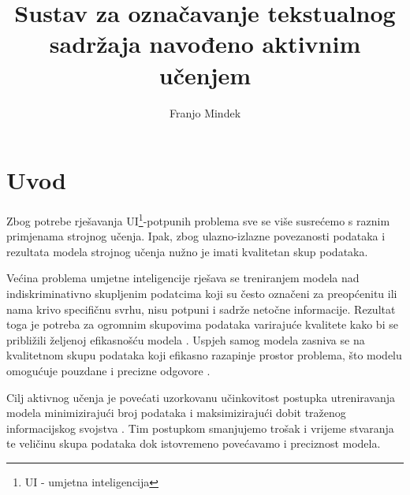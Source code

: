 \documentclass[times, utf8, zavrsni, numeric]{fer}
\begin{document}

\title{Sustav za označavanje tekstualnog sadržaja navođeno aktivnim učenjem}

\author{Franjo Mindek}

\maketitle  



\zahvala{}

\tableofcontents


\chapter{Uvod}
Zbog potrebe rješavanja UI\footnote{UI - umjetna inteligencija}-potpunih problema sve se više susrećemo s raznim primjenama strojnog učenja.
Ipak, zbog ulazno-izlazne povezanosti podataka i rezultata modela strojnog učenja nužno je imati kvalitetan skup podataka.

Većina problema umjetne inteligencije rješava se treniranjem modela nad indiskriminativno skupljenim podatcima koji su često označeni za preopćenitu ili nama krivo specifičnu svrhu, nisu potpuni i sadrže netočne informacije. Rezultat toga je potreba za ogromnim skupovima podataka varirajuće kvalitete kako bi se približili željenoj efikasnošću modela \citep{baliga1997learning}. Uspjeh samog modela zasniva se na kvalitetnom skupu podataka koji efikasno razapinje prostor problema, što modelu omogućuje pouzdane i precizne odgovore \citep{jain2020overview}.

Cilj aktivnog učenja je povećati uzorkovanu učinkovitost postupka utreniravanja modela minimizirajući broj podataka i maksimizirajući dobit traženog informacijskog svojstva \citep{settles2009active}.
Tim postupkom smanjujemo trošak i vrijeme stvaranja \citep{baldridge2009well} te veličinu skupa podataka dok istovremeno povećavamo i preciznost modela.
\end{document}
